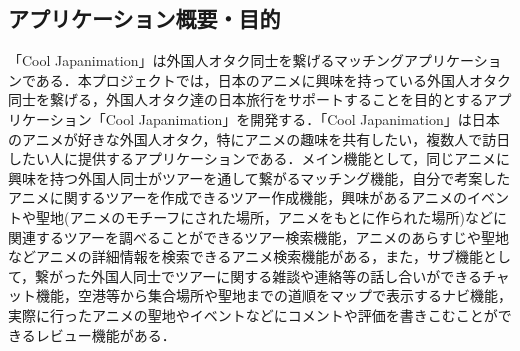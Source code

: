 \subsection{アプリケーション概要・目的}
\par
「Cool Japanimation」は外国人オタク同士を繋げるマッチングアプリケーションである．本プロジェクトでは，日本のアニメに興味を持っている外国人オタク同士を繋げる，外国人オタク達の日本旅行をサポートすることを目的とするアプリケーション「Cool Japanimation」を開発する．「Cool Japanimation」は日本のアニメが好きな外国人オタク，特にアニメの趣味を共有したい，複数人で訪日したい人に提供するアプリケーションである．メイン機能として，同じアニメに興味を持つ外国人同士がツアーを通して繋がるマッチング機能，自分で考案したアニメに関するツアーを作成できるツアー作成機能，興味があるアニメのイベントや聖地(アニメのモチーフにされた場所，アニメをもとに作られた場所)などに関連するツアーを調べることができるツアー検索機能，アニメのあらすじや聖地などアニメの詳細情報を検索できるアニメ検索機能がある，また，サブ機能として，繋がった外国人同士でツアーに関する雑談や連絡等の話し合いができるチャット機能，空港等から集合場所や聖地までの道順をマップで表示するナビ機能，実際に行ったアニメの聖地やイベントなどにコメントや評価を書きこむことができるレビュー機能がある．
